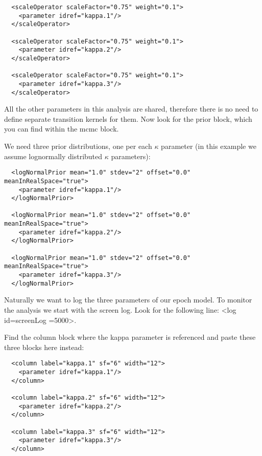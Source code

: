 \medskip{}

\begin{lstlisting}
  <scaleOperator scaleFactor="0.75" weight="0.1">
    <parameter idref="kappa.1"/>
  </scaleOperator>
		
  <scaleOperator scaleFactor="0.75" weight="0.1">
    <parameter idref="kappa.2"/>
  </scaleOperator>
		
  <scaleOperator scaleFactor="0.75" weight="0.1">
    <parameter idref="kappa.3"/>
  </scaleOperator>
\end{lstlisting}

\medskip{}

All the other parameters in this analysis are shared, therefore there is no need to define separate transition kernels for them.
Now look for the {\color{darkblue}prior} block, which you can find within the {\color{darkblue}mcmc} block.

We need three prior distributions, one per each $\kappa$ parameter (in this example we assume lognormally distributed $\kappa$ parameters):

\medskip{}

\begin{lstlisting}
  <logNormalPrior mean="1.0" stdev="2" offset="0.0" meanInRealSpace="true">
    <parameter idref="kappa.1"/>
  </logNormalPrior>
				
  <logNormalPrior mean="1.0" stdev="2" offset="0.0" meanInRealSpace="true">
    <parameter idref="kappa.2"/>
  </logNormalPrior>
				
  <logNormalPrior mean="1.0" stdev="2" offset="0.0" meanInRealSpace="true">
    <parameter idref="kappa.3"/>
  </logNormalPrior>
\end{lstlisting}

\medskip{}

Naturally we want to log the three parameters of our epoch model. 
To monitor the analysis we start with the screen log. 
Look for the following line: <{\color{darkblue}log} {\color{darkblue}id}=\textquotedbl{}screenLog =\textquotedbl{}5000\textquotedbl{}>.

Find the {\color{darkblue}column} block where the kappa parameter is referenced and paste these three blocks here instead:

\medskip{}

\begin{lstlisting}
  <column label="kappa.1" sf="6" width="12">
    <parameter idref="kappa.1"/>
  </column>
			
  <column label="kappa.2" sf="6" width="12">
    <parameter idref="kappa.2"/>
  </column>
			
  <column label="kappa.3" sf="6" width="12">
    <parameter idref="kappa.3"/>
  </column>
\end{lstlisting}

